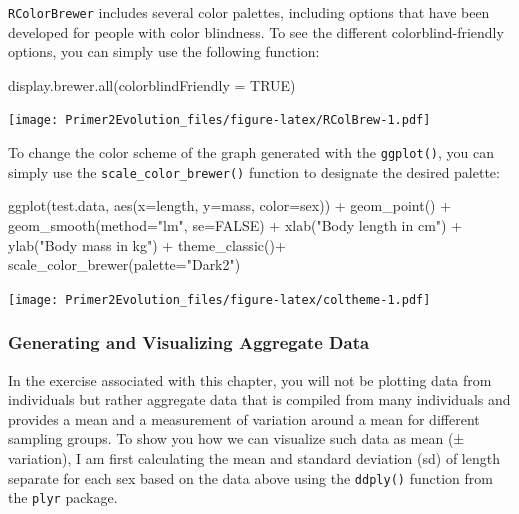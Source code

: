 \documentclass[
]{book}
\newenvironment{Shaded}{\begin{snugshade}}{\end{snugshade}}
\newcommand{\AttributeTok}[1]{\textcolor[rgb]{0.77,0.63,0.00}{#1}}
\newcommand{\ConstantTok}[1]{\textcolor[rgb]{0.00,0.00,0.00}{#1}}
\newcommand{\FunctionTok}[1]{\textcolor[rgb]{0.00,0.00,0.00}{#1}}
\newcommand{\NormalTok}[1]{#1}
\newcommand{\SpecialCharTok}[1]{\textcolor[rgb]{0.00,0.00,0.00}{#1}}
\newcommand{\StringTok}[1]{\textcolor[rgb]{0.31,0.60,0.02}{#1}}
\begin{document}
\texttt{RColorBrewer} includes several color palettes, including options that have been developed for people with color blindness. To see the different colorblind-friendly options, you can simply use the following function:

\begin{Shaded}
\begin{Highlighting}[]
\FunctionTok{display.brewer.all}\NormalTok{(}\AttributeTok{colorblindFriendly =} \ConstantTok{TRUE}\NormalTok{)}
\end{Highlighting}
\end{Shaded}

\texttt{[image: Primer2Evolution\_files/figure-latex/RColBrew-1.pdf]}

To change the color scheme of the graph generated with the \texttt{ggplot()}, you can simply use the \texttt{scale\_color\_brewer()} function to designate the desired palette:

\begin{Shaded}
\begin{Highlighting}[]
\FunctionTok{ggplot}\NormalTok{(test.data, }\FunctionTok{aes}\NormalTok{(}\AttributeTok{x=}\NormalTok{length, }\AttributeTok{y=}\NormalTok{mass, }\AttributeTok{color=}\NormalTok{sex)) }\SpecialCharTok{+}
  \FunctionTok{geom\_point}\NormalTok{() }\SpecialCharTok{+}
  \FunctionTok{geom\_smooth}\NormalTok{(}\AttributeTok{method=}\StringTok{"lm"}\NormalTok{, }\AttributeTok{se=}\ConstantTok{FALSE}\NormalTok{) }\SpecialCharTok{+}
  \FunctionTok{xlab}\NormalTok{(}\StringTok{"Body length in cm"}\NormalTok{) }\SpecialCharTok{+}
  \FunctionTok{ylab}\NormalTok{(}\StringTok{"Body mass in kg"}\NormalTok{) }\SpecialCharTok{+}
  \FunctionTok{theme\_classic}\NormalTok{()}\SpecialCharTok{+}
  \FunctionTok{scale\_color\_brewer}\NormalTok{(}\AttributeTok{palette=}\StringTok{"Dark2"}\NormalTok{)}
\end{Highlighting}
\end{Shaded}

\texttt{[image: Primer2Evolution\_files/figure-latex/coltheme-1.pdf]}

\hypertarget{generating-and-visualizing-aggregate-data}{%
\subsubsection*{Generating and Visualizing Aggregate Data}\label{generating-and-visualizing-aggregate-data}}

In the exercise associated with this chapter, you will not be plotting data from individuals but rather aggregate data that is compiled from many individuals and provides a mean and a measurement of variation around a mean for different sampling groups. To show you how we can visualize such data as mean (± variation), I am first calculating the mean and standard deviation (sd) of length separate for each sex based on the data above using the \texttt{ddply()} function from the \texttt{plyr} package.
\end{document}
